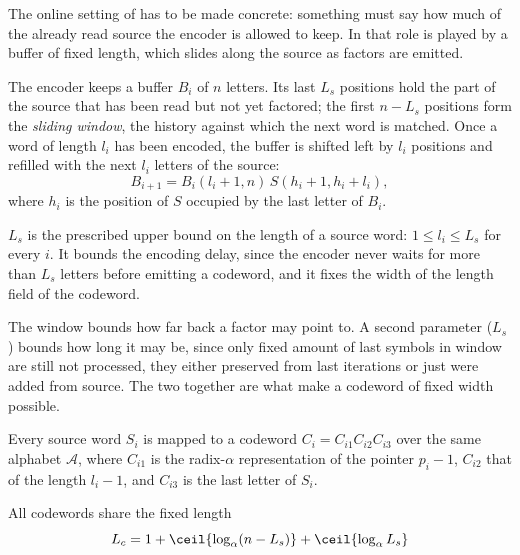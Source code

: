 The online setting of  has to be made concrete: something must say how much of the already read source the encoder is allowed to keep. In \cite{ziv1977} that role is played by a buffer of fixed length, which slides along the source as factors are emitted.
\begin{definition}
\label{def:sliding-window}
    The encoder keeps a buffer \(B_i\) of \(n\) letters. Its last \(L_s\)
    positions hold the part of the source that has been read but not yet factored;
    the first \(n - L_s\) positions form the \emph{sliding window}, the history
    against which the next word is matched. Once a word of length \(l_i\) has
    been encoded, the buffer is shifted left by \(l_i\) positions and refilled
    with the next \(l_i\) letters of the source:
    \[
      B_{i+1} = B_i(l_i + 1, n)\, S(h_i + 1, h_i + l_i),
    \]
    where \(h_i\) is the position of \(S\) occupied by the last letter of \(B_i\).
\end{definition}

\begin{definition}
\label{def:Ls}
    \(L_s\) is the prescribed upper bound on the length of a source word:
    \(1 \leq l_i \leq L_s\) for every \(i\). It bounds the encoding delay,
    since the encoder never waits for more than \(L_s\) letters before emitting a
    codeword, and it fixes the width of the length field of the codeword.
\end{definition}

\noindent The window bounds how  far back a factor may point to. A second parameter (\(L_s\)) bounds how long it may be, since only fixed amount of last symbols in window are still not processed, they either preserved from last iterations or just were added from source. The two together are what make a codeword of fixed width possible.

\begin{definition}
\label{def:Lc}
    Every source word \(S_i\) is mapped to a codeword
    \(C_i = C_{i1} C_{i2} C_{i3}\) over the same alphabet \(\mathcal{A}\), where
    \(C_{i1}\) is the radix-\(\alpha\) representation of the pointer \(p_i - 1\),
    \(C_{i2}\) that of the length \(l_i - 1\), and \(C_{i3}\) is the last letter
    of \(S_i\).
\end{definition}
\noindent All codewords share the fixed length
\[
  L_c = 1 + \ceil{\log_\alpha (n - L_s)} + \ceil{\log_\alpha L_s} 
\]


